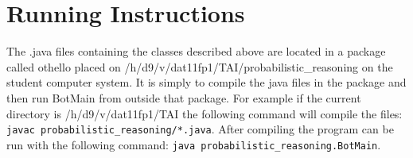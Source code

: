 \documentclass[a4paper]{article}
\begin{document}
\section{Running Instructions} The .java files containing the classes described
above are located in a package called othello placed on
/h/d9/v/dat11fp1/TAI/probabilistic\_reasoning on the student computer system. It
is simply to compile the java files in the package and then run BotMain from
outside that package. For example if the current directory is
/h/d9/v/dat11fp1/TAI the following command will compile the files: \texttt{javac
probabilistic\_reasoning/*.java}. After compiling the program can be run with
the following command: \texttt{java probabilistic\_reasoning.BotMain}.

\end{document}

